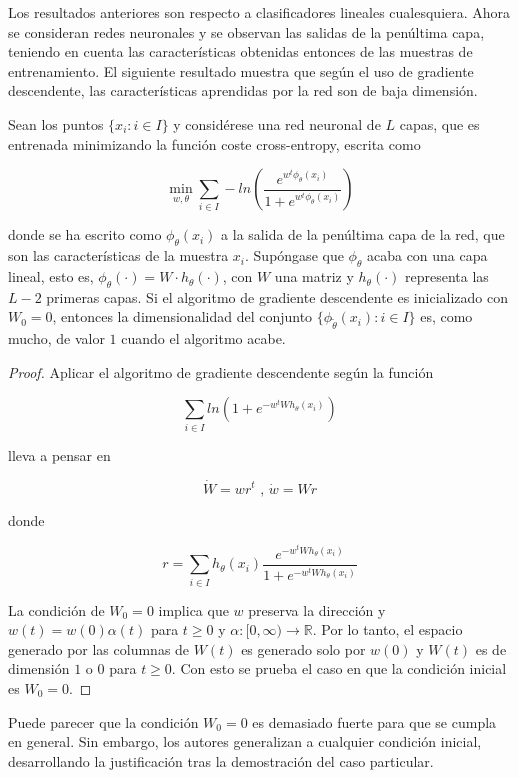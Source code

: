 Los resultados anteriores son respecto a clasificadores lineales cualesquiera. Ahora se consideran redes neuronales y se observan las salidas de la penúltima capa, teniendo en cuenta las características obtenidas entonces de las muestras de entrenamiento. El siguiente resultado muestra que según el uso de gradiente descendente, las características aprendidas por la red son de baja dimensión.

\begin{proposicion}
Sean los puntos $\{x_i: i \in I\}$ y considérese una red neuronal de $L$ capas, que es entrenada minimizando la función coste cross-entropy, escrita como

$$\min_{w,\theta} \sum_{i \in I} -ln \left( \frac{e^{w^{t} \phi_{\theta}(x_i)}}{1+e^{w^{t} \phi_{\theta}(x_i)}} \right)$$

donde se ha escrito como $\phi_{\theta}(x_i)$ a la salida de la penúltima capa de la red, que son las características de la muestra $x_i$. Supóngase que $\phi_{\theta}$ acaba con una capa lineal, esto es, $\phi_{\theta}(\cdot) = W \cdot h_{\theta}(\cdot)$, con $W$ una matriz y $h_{\theta}(\cdot)$ representa las $L-2$ primeras capas. Si el algoritmo de gradiente descendente es inicializado con $W_0 = 0$, entonces la dimensionalidad del conjunto $\{\phi_{\tilde{\theta}}(x_i) : i \in I\}$ es, como mucho, de valor $1$ cuando el algoritmo acabe.

\end{proposicion}

\begin{proof}
Aplicar el algoritmo de gradiente descendente según la función

$$\sum_{i \in I} ln(1+e^{-w^{t}W h_{\theta}(x_i)})$$

lleva a pensar en

$$\dot{W} = w r^{t} \text{ , } \dot{w} = W r$$

donde 

$$r = \sum_{i \in I} h_{\theta}(x_i) \frac{e^{-w^{t}W h_{\theta}(x_i)}}{1+e^{-w^{t} W h_{\theta}(x_i)}}$$

La condición de $W_0=0$ implica que $w$ preserva la dirección y $w(t)=w(0) \alpha(t)$ para $t \geq 0$ y $\alpha: [0,\infty) \to \mathbb{R}$. Por lo tanto, el espacio generado por las columnas de $W(t)$ es generado solo por $w(0)$ y $W(t)$ es de dimensión $1$ o $0$ para $t \geq 0$. Con esto se prueba el caso en que la condición inicial es $W_0=0$.
\end{proof}

Puede parecer que la condición $W_0=0$ es demasiado fuerte para que se cumpla en general. Sin embargo, los autores generalizan a cualquier condición inicial, desarrollando la justificación tras la demostración del caso particular.

